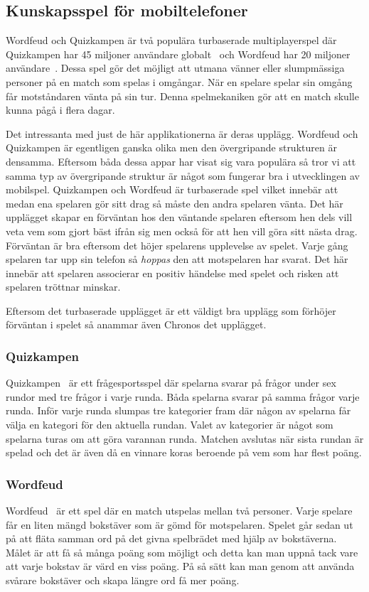\documentclass[a4paper, 11pt]{article}
\begin{document}
\subsection{Kunskapsspel för mobiltelefoner}
Wordfeud och Quizkampen är två populära turbaserade multiplayerspel där Quizkampen har 45 miljoner användare globalt~\cite{quiz} och Wordfeud har 20 miljoner användare~\cite{wordfeud}. Dessa spel gör det möjligt att utmana vänner eller slumpmässiga personer på en match som spelas i omgångar. När en spelare spelar sin omgång får motståndaren vänta på sin tur. Denna spelmekaniken gör att en match skulle kunna pågå i flera dagar.

Det intressanta med just de här applikationerna är deras upplägg. Wordfeud och Quizkampen är egentligen ganska olika men den övergripande strukturen är densamma. Eftersom båda dessa appar har visat sig vara populära så tror vi att samma typ av övergripande struktur är något som fungerar bra i utvecklingen av mobilspel. Quizkampen och Wordfeud är turbaserade spel vilket innebär att medan ena spelaren gör sitt drag så måste den andra spelaren vänta. Det här upplägget skapar en förväntan hos den väntande spelaren eftersom hen dels vill veta vem som gjort bäst ifrån sig men också för att hen vill göra sitt nästa drag. Förväntan är bra eftersom det höjer spelarens upplevelse av spelet. Varje gång spelaren tar upp sin telefon så \textit{hoppas} den att motspelaren har svarat. Det här innebär att spelaren associerar en positiv händelse med spelet och risken att spelaren tröttnar minskar.

Eftersom det turbaserade upplägget är ett väldigt bra upplägg som förhöjer förväntan i spelet så anammar även Chronos det upplägget. 

\subsubsection{Quizkampen}
Quizkampen~\cite{aboutquiz} är ett frågesportsspel där spelarna svarar på frågor under sex rundor med tre frågor i varje runda. Båda spelarna svarar på samma frågor varje runda.  Inför varje runda slumpas tre kategorier fram där någon av spelarna får välja en kategori för den aktuella rundan. Valet av kategorier är något som spelarna turas om att göra varannan runda. Matchen avslutas när sista rundan är spelad och det är även då en vinnare koras beroende på vem som har flest poäng. 

\subsubsection{Wordfeud}
Wordfeud~\cite{aboutwordfeud} är ett spel där en match utspelas mellan två personer. Varje spelare får en liten mängd bokstäver som är gömd för motspelaren. Spelet går sedan ut på att fläta samman ord på det givna spelbrädet med hjälp av bokstäverna. Målet är att få så många poäng som möjligt och detta kan man uppnå tack vare att varje bokstav är värd en viss poäng. På så sätt kan man genom att använda svårare bokstäver och skapa längre ord få mer poäng. 
\end{document}
